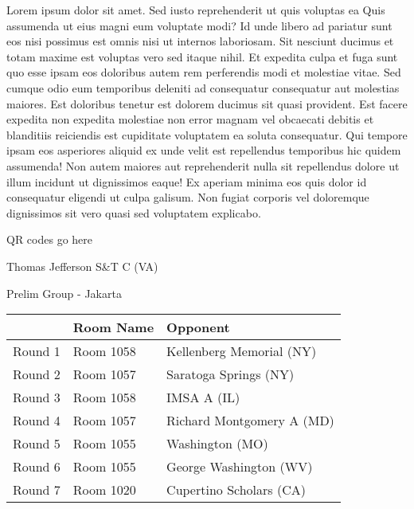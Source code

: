 \documentclass{article}%
\begin{document}
\vspace*{8pt}%
\linebreak%
\newline%
\newline%
Lorem ipsum dolor sit amet. Sed iusto reprehenderit ut quis voluptas ea Quis assumenda ut eius magni eum voluptate modi? Id unde libero ad pariatur sunt eos nisi possimus est omnis nisi ut internos laboriosam. Sit nesciunt ducimus et totam maxime est voluptas vero sed itaque nihil. Et expedita culpa et fuga sunt quo esse ipsam eos doloribus autem rem perferendis modi et molestiae vitae.\newline%
\newline%
Sed cumque odio eum temporibus deleniti ad consequatur consequatur aut molestias maiores. Est doloribus tenetur est dolorem ducimus sit quasi provident. Est facere expedita non expedita molestiae non error magnam vel obcaecati debitis et blanditiis reiciendis est cupiditate voluptatem ea soluta consequatur. Qui tempore ipsam eos asperiores aliquid ex unde velit est repellendus temporibus hic quidem assumenda!\newline%
\newline%
Non autem maiores aut reprehenderit nulla sit repellendus dolore ut illum incidunt ut dignissimos eaque! Ex aperiam minima eos quis dolor id consequatur eligendi ut culpa galisum. Non fugiat corporis vel doloremque dignissimos sit vero quasi sed voluptatem explicabo.\newline%
\newline%
%
\vspace*{30pt}%
\begin{center}%
\begin{Huge}%
QR codes go here%
\end{Huge}%
\end{center}%
\newpage%
%
\begin{center}%
\begin{Huge}%
Thomas Jefferson S\&T C (VA)%
\end{Huge}%
\vspace*{8pt}%
\linebreak%
\begin{Large}%
Prelim Group {-} Jakarta%
\end{Large}%
\end{center}%
\begin{tabularx}{\textwidth}{|c|Y|Y|}%
\hline%
&Room Name&Opponent\\%
\hline%
Round 1&Room 1058&Kellenberg Memorial (NY)\\%
Round 2&Room 1057&Saratoga Springs (NY)\\%
Round 3&Room 1058&IMSA A (IL)\\%
Round 4&Room 1057&Richard Montgomery A (MD)\\%
Round 5&Room 1055&Washington (MO)\\%
Round 6&Room 1055&George Washington (WV)\\%
Round 7&Room 1020&Cupertino Scholars (CA)\\%
\hline%
\end{tabularx}%
\end{document}
